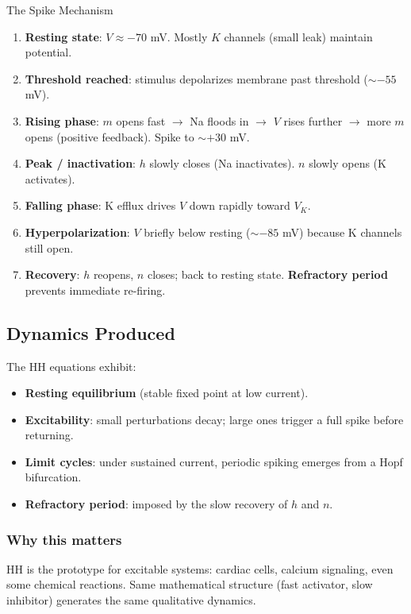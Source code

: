 \documentclass[11pt]{article}
\begin{document}
\begin{intuitionbox}{The Spike Mechanism}
\begin{enumerate}
\item \textbf{Resting state}: $V \approx -70$ mV. Mostly $K$ channels (small leak) maintain potential.
\item \textbf{Threshold reached}: stimulus depolarizes membrane past threshold ($\sim -55$ mV).
\item \textbf{Rising phase}: $m$ opens fast $\to$ Na floods in $\to$ $V$ rises further $\to$ more $m$ opens (positive feedback). Spike to $\sim +30$ mV.
\item \textbf{Peak / inactivation}: $h$ slowly closes (Na inactivates). $n$ slowly opens (K activates).
\item \textbf{Falling phase}: K efflux drives $V$ down rapidly toward $V_K$.
\item \textbf{Hyperpolarization}: $V$ briefly below resting ($\sim -85$ mV) because K channels still open.
\item \textbf{Recovery}: $h$ reopens, $n$ closes; back to resting state. \textbf{Refractory period} prevents immediate re-firing.
\end{enumerate}
\end{intuitionbox}

\subsection{Dynamics Produced}

The HH equations exhibit:
\begin{itemize}
\item \textbf{Resting equilibrium} (stable fixed point at low current).
\item \textbf{Excitability}: small perturbations decay; large ones trigger a full spike before returning.
\item \textbf{Limit cycles}: under sustained current, periodic spiking emerges from a Hopf bifurcation.
\item \textbf{Refractory period}: imposed by the slow recovery of $h$ and $n$.
\end{itemize}

\subsubsection{Why this matters} HH is the prototype for excitable systems: cardiac cells, calcium signaling, even some chemical reactions. Same mathematical structure (fast activator, slow inhibitor) generates the same qualitative dynamics.
\end{document}
